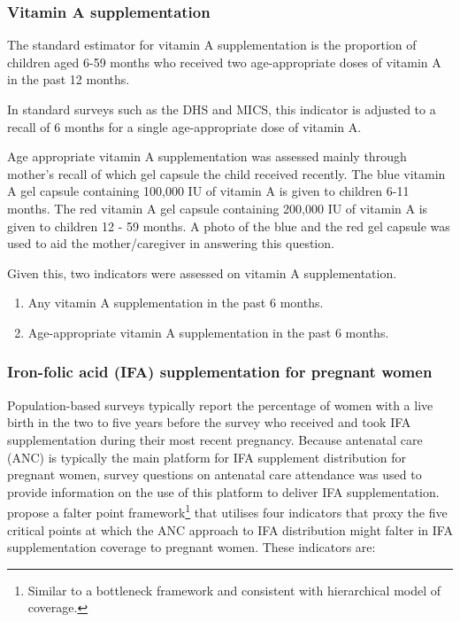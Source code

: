 \documentclass[12pt,a4paper]{article}
\let\rmarkdownfootnote\footnote%
\def\footnote{\protect\rmarkdownfootnote}
\theoremstyle{definition}
\theoremstyle{definition}
\theoremstyle{definition}
\theoremstyle{remark}
\begin{document}
\hypertarget{vitamin-a-supplementation}{%
\subsubsection{Vitamin A
supplementation}\label{vitamin-a-supplementation}}

The standard estimator for vitamin A supplementation is the proportion
of children aged 6-59 months who received two age-appropriate doses of
vitamin A in the past 12 months.

In standard surveys such as the DHS and MICS, this indicator is adjusted
to a recall of 6 months for a single age-appropriate dose of vitamin A.

Age appropriate vitamin A supplementation was assessed mainly through
mother's recall of which gel capsule the child received recently. The
blue vitamin A gel capsule containing 100,000 IU of vitamin A is given
to children 6-11 months. The red vitamin A gel capsule containing
200,000 IU of vitamin A is given to children 12 - 59 months. A photo of
the blue and the red gel capsule was used to aid the mother/caregiver in
answering this question.

Given this, two indicators were assessed on vitamin A supplementation.

\begin{enumerate}
\def\labelenumi{\arabic{enumi}.}
\item
  Any vitamin A supplementation in the past 6 months.
\item
  Age-appropriate vitamin A supplementation in the past 6 months.
\end{enumerate}

\hypertarget{iron-folic-acid-ifa-supplementation-for-pregnant-women}{%
\subsubsection{Iron-folic acid (IFA) supplementation for pregnant
women}\label{iron-folic-acid-ifa-supplementation-for-pregnant-women}}

Population-based surveys typically report the percentage of women with a
live birth in the two to five years before the survey who received and
took IFA supplementation during their most recent pregnancy. Because
antenatal care (ANC) is typically the main platform for IFA supplement
distribution for pregnant women, survey questions on antenatal care
attendance was used to provide information on the use of this platform
to deliver IFA supplementation. \citet{Sununtnasuk:2015kb} propose a
falter point framework\footnote{Similar to a bottleneck framework and
  consistent with \citet{Tanahashi:1978we} hierarchical model of
  coverage.} that utilises four indicators that proxy the five critical
points at which the ANC approach to IFA distribution might falter in IFA
supplementation coverage to pregnant women. These indicators are:
\end{document}
